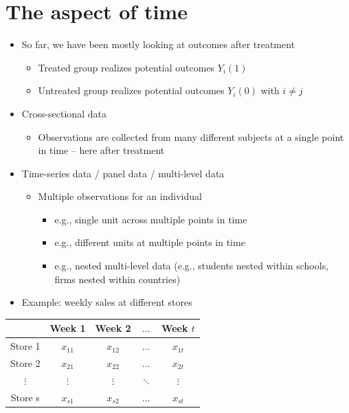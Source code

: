 \documentclass[10pt]{article}
\begin{document}
\section{The aspect of time}
\begin{itemize}
    \item So far, we have been mostly looking at outcomes after treatment 
    \begin{itemize}
        \item Treated group realizes potential outcomes $Y_i(1) $
        \item Untreated group realizes potential outcomes $Y_i(0) $ with $i \neq j $
    \end{itemize}
    \item Cross-sectional data 
    \begin{itemize}
        \item Observations are collected from many different subjects at a single point in time -- here after treatment
    \end{itemize}
    \item Time-series data / panel data / multi-level data 
    \begin{itemize}
        \item Multiple observations for an individual 
        \begin{itemize}
            \item e.g., single unit across multiple points in time 
            \item e.g., different units at multiple points in time 
            \item e.g., nested multi-level data (e.g., students nested within schools, firms nested within countries)
        \end{itemize}
    \end{itemize}
    \item Example: weekly sales at different stores
\end{itemize}
\begin{center}
    \begin{tabular}{|c|c|c|c|c|}
        \hline 
        & Week 1 & Week 2 & $\dots$ & Week $t$\\\hline 
        Store 1 & $x_{11}$ & $x_{12} $ & $\dots$ & $x_{1t} $\\\hline 
        Store 2 & $x_{21}$ & $x_{22} $ & $\dots$ & $x_{2t} $\\\hline 
        $\vdots $ &$\vdots $ &$\vdots $ &$\ddots $ &$\vdots $ \\\hline
        Store s & $x_{s1}$ & $x_{s2} $ & $\dots$ & $x_{st} $\\\hline 
    \end{tabular}
\end{center}
\newpage 
\end{document}
